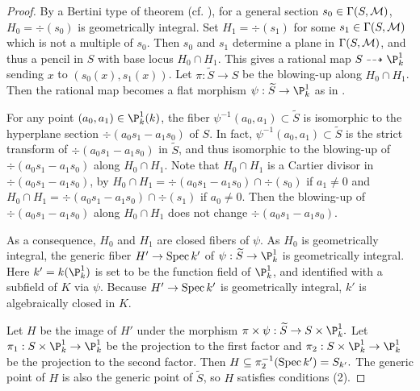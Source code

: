 \begin{proof}
By a Bertini type of theorem (cf. \cite[Theorem 6.10]{Jouanolou}), for a general section
$s_0\in \Gamma(S,{\mathcal M})$, $H_0=\div(s_0)$ is geometrically integral.
Set $H_1=\div(s_1)$ for some $s_1\in \Gamma(S,{\mathcal M})$ which is not a multiple of $s_0$.
Then $s_0$ and $s_1$ determine a plane in $\Gamma(S,{\mathcal M})$, and thus a pencil in $S$ with base locus $H_0\cap H_1$.
This gives a rational map $S\dashrightarrow \P^1_k$ sending $x$ to $(s_0(x),s_1(x))$.
Let $\pi:\widetilde S\to S$ be the blowing-up along $H_0\cap H_1$.
Then the rational map becomes a flat morphism $\psi:\widetilde S\to \P^1_k$ as in \cite[II, Example 7.17.3]{Hartshorne1977}.

For any point $(a_0,a_1)\in \P^1_k(k)$, the fiber $\psi^{-1}(a_0,a_1)\subset \widetilde S$ is isomorphic to the hyperplane section $\div(a_0s_1-a_1s_0)$ of $S$. In fact, $\psi^{-1}(a_0,a_1)\subset \widetilde S$ is the strict transform of
$\div(a_0s_1-a_1s_0)$ in $\widetilde S$, and thus isomorphic to the blowing-up of $\div(a_0s_1-a_1s_0)$ along $H_0\cap H_1$. Note that $H_0\cap H_1$ is a Cartier divisor in $\div(a_0s_1-a_1s_0)$, by
$H_0\cap H_1=\div(a_0s_1-a_1s_0)\cap \div(s_0)$ if $a_1\neq 0$ and $H_0\cap H_1=\div(a_0s_1-a_1s_0)\cap \div(s_1)$ if $a_0\neq 0$.
Then the blowing-up of $\div(a_0s_1-a_1s_0)$ along $H_0\cap H_1$ does not change $\div(a_0s_1-a_1s_0)$.

As a consequence, $H_0$ and $H_1$ are closed fibers of $\psi$.
As $H_0$ is geometrically integral, the generic fiber $H' \to {\rm Spec \,} k'$ of $\psi:\widetilde S\to \P^1_k$ is geometrically integral.
Here $k'=k(\P^1_k)$ is set to be the function field of $\P^1_k$, and identified with a subfield of $K$ via $\psi$.
Because $H' \to {\rm Spec \,} k'$ is geometrically integral,
$k'$ is algebraically closed in $K.$

Let $H$ be the image of $H'$ under the morphism $\pi\times \psi: \widetilde S \to S\times \P^1_k.$
Let $\pi_1: S\times \P^1_k\to \P^1_k$ be the projection to the first factor and
$\pi_2:S\times \P^1_k\to \P^1_k$ be the projection to the second factor. Then $H\subseteq \pi_2^{-1}({\rm Spec \,} k')=S_{k'}.$
The generic point of $H$ is also the generic point of $\widetilde S$, so $H$
satisfies conditions (2).


\end{proof}
